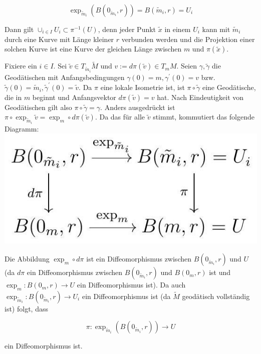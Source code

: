 \documentclass[10pt, letterpaper]{article}
\begin{document}
$$
\exp _{\tilde{m}_{i}}\left(B\left(0_{\tilde{m}_{i}}, r\right)\right)=B\left(\tilde{m}_{i}, r\right)=U_{i}
$$

Dann gilt $\cup_{i \in I} U_{i} \subset \pi^{-1}(U)$, denn jeder Punkt $\tilde{x}$ in einem $U_{i}$ kann mit $\tilde{m}_{i}$ durch eine Kurve mit Länge kleiner $r$ verbunden werden und die Projektion einer solchen Kurve ist eine Kurve der gleichen Länge zwischen $m$ und $\pi(\tilde{x})$.

Fixiere ein $i \in I$. Sei $\tilde{v} \in T_{\tilde{m}_{i}} \tilde{M}$ und $v:=d \pi(\tilde{v}) \in T_{m} M$. Seien $\gamma, \tilde{\gamma}$ die Geodätischen mit Anfangsbedingungen $\gamma(0)=m, \gamma^{\prime}(0)=v$ bzw. $\tilde{\gamma}(0)=\tilde{m}_{i}, \tilde{\gamma}^{\prime}(0)=\tilde{v}$. Da $\pi$ eine lokale Isometrie ist, ist $\pi \circ \tilde{\gamma}$ eine Geodätische, die in $m$ beginnt und Anfangsvektor $d \pi(\tilde{v})=v$ hat. Nach Eindeutigkeit von Geodätischen gilt also $\pi \circ \tilde{\gamma}=\gamma$. Anders ausgedrückt ist $\pi \circ \exp _{\tilde{m}_{i}} \tilde{v}=\exp _{m} \circ d \pi(\tilde{v})$. Da das für alle $\tilde{v}$ stimmt, kommutiert das folgende Diagramm:\\
\includegraphics[max width=\textwidth, center]{2025_05_20_3825c151ba0898b77b6eg-083}

Die Abbildung $\exp _{m} \circ d \pi$ ist ein Diffeomorphismus zwischen $B\left(0_{\tilde{m}_{i}}, r\right)$ und $U$ (da $d \pi$ ein Diffeomorphismus zwischen $B\left(0_{\tilde{m}_{i}}, r\right)$ und $B\left(0_{m}, r\right)$ ist und $\exp _{m}: B\left(0_{m}, r\right) \rightarrow U$ ein Diffeomorphismus ist). Da auch $\exp _{\tilde{m}_{i}}: B\left(0_{\tilde{m}_{i}}, r\right) \rightarrow U_{i}$ ein Diffeomorphismus ist (da $\tilde{M}$ geodätisch vollständig ist) folgt, dass

$$
\pi: \exp _{\tilde{m}_{i}}\left(B\left(0_{\tilde{m}_{i}}, r\right)\right) \rightarrow U
$$

ein Diffeomorphismus ist.
\end{document}
